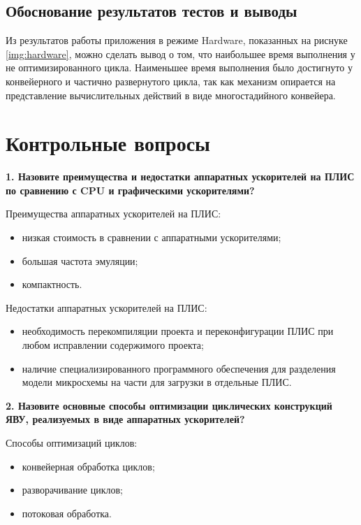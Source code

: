 \section{Обоснование результатов тестов и выводы}

Из результатов работы приложения в режиме Hardware, показанных на риснуке \ref{img:hardware}, можно сделать вывод о том, что наибольшее время выполнения у не оптимизированного цикла. Наименьшее время выполнения было достигнуто у конвейерного и частично развернутого цикла, так как механизм опирается на представление вычислительных действий в виде многостадийного конвейера.

\chapter{Контрольные вопросы}

\textbf{1. Назовите преимущества и недостатки аппаратных ускорителей на ПЛИС по сравнению с CPU и графическими ускорителями?}

Преимущества аппаратных ускорителей на ПЛИС:
\begin{itemize}
	\item низкая стоимость в сравнении с аппаратными ускорителями;
	\item большая частота эмуляции;
	\item компактность.
\end{itemize}

Недостатки аппаратных ускорителей на ПЛИС:
\begin{itemize}
	\item необходимость перекомпиляции проекта и переконфигурации ПЛИС при любом исправлении содержимого проекта;
	\item наличие специализированного программного обеспечения для разделения модели микросхемы на части для загрузки в отдельные ПЛИС.
\end{itemize}

\textbf{2. Назовите основные способы оптимизации циклических конструкций ЯВУ, реализуемых в виде аппаратных ускорителей?}

Способы оптимизаций циклов:

\begin{itemize}
	\item конвейерная обработка циклов;
	\item разворачивание циклов;
	\item потоковая обработка.
\end{itemize}

